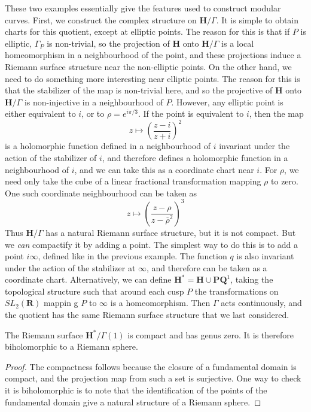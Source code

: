 These two examples essentially give the features used to construct modular curves. First, we construct the complex structure on $\mathbf{H}/\Gamma$. It is simple to obtain charts for this quotient, except at elliptic points. The reason for this is that if $P$ is elliptic, $\Gamma_P$ is non-trivial, so the projection of $\mathbf{H}$ onto $\mathbf{H}/\Gamma$ is a local homeomorphism in a neighbourhood of the point, and these projections induce a Riemann surface structure near the non-elliptic points. On the other hand, we need to do something more interesting near elliptic points. The reason for this is that the stabilizer of the map is non-trivial here, and so the projective of $\mathbf{H}$ onto $\mathbf{H}/\Gamma$ is non-injective in a neighbourhood of $P$. However, any elliptic point is either equivalent to $i$, or to $\rho = e^{i \pi/3}$. If the point is equivalent to $i$, then the map
%
\[ z \mapsto \left( \frac{z - i}{z + i} \right)^2 \]
%
is a holomorphic function defined in a neighbourhood of $i$ invariant under the action of the stabilizer of $i$, and therefore defines a holomorphic function in a neighbourhood of $i$, and we can take this as a coordinate chart near $i$. For $\rho$, we need only take the cube of a linear fractional transformation mapping $\rho$ to zero. One such coordinate neighbourhood can be taken as
%
\[ z \mapsto \left( \frac{z - \rho}{z - \overline{\rho}^2} \right)^3 \]
%
Thus $\mathbf{H}/\Gamma$ has a natural Riemann surface structure, but it is not compact. But we {\it can} compactify it by adding a point. The simplest way to do this is to add a point $i \infty$, defined like in the previous example. The function $q$ is also invariant under the action of the stabilizer at $\infty$, and therefore can be taken as a coordinate chart. Alternatively, we can define $\mathbf{H}^* = \mathbf{H} \cup \mathbf{PQ}^1$, taking the topological structure such that around each cusp $P$ the transformations on $SL_2(\mathbf{R})$ mappin g $P$ to $\infty$ is a homeomorphism. Then $\Gamma$ acts continuously, and the quotient has the same Riemann surface structure that we last considered.

\begin{theorem}
    The Riemann surface $\mathbf{H}^*/\Gamma(1)$ is compact and has genus zero. It is therefore biholomorphic to a Riemann sphere.
\end{theorem}
\begin{proof}
    The compactness follows because the closure of a fundamental domain is compact, and the projection map from such a set is surjective. One way to check it is biholomorphic is to note that the identification of the points of the fundamental domain give a natural structure of a Riemann sphere.
\end{proof}

